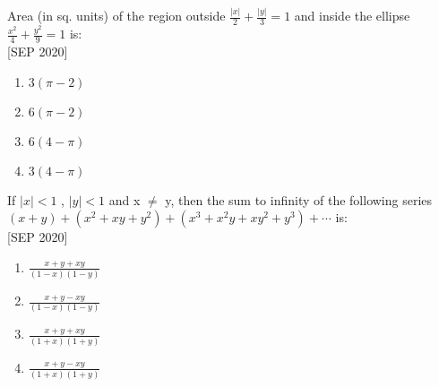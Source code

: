     \item Area (in sq. units) of the region outside $\frac{|x|}{2} + \frac{|y|}{3} = 1$ and inside the ellipse $\frac{x^2}{4} + \frac{y^2}{9} = 1$ is: \\\hfill{[SEP 2020]}
    \begin{multicols}{4}
    \begin{enumerate}
        \item $3(\pi - 2)$
        \item $6(\pi - 2)$
        \item $6(4 - \pi)$
        \item $3(4 - \pi)$
    \end{enumerate} 
    \end{multicols}
    \item If $|x|<1$ , $|y|<1$ and x $\neq$ y, then the sum to infinity of the following series $(x+y)+(x^2+xy+y^2)+(x^3+x^2y+xy^2+y^3)+\cdots$ is: \\\hfill{[SEP 2020]}
    \begin{multicols}{4}
    \begin{enumerate}
        \item $\frac{x + y + xy}{(1 - x)(1 - y)}$
        \item $\frac{x + y - xy}{(1 - x)(1 - y)}$
        \item $\frac{x + y + xy}{(1 + x)(1 + y)}$
        \item $\frac{x + y - xy}{(1 + x)(1 + y)}$
    \end{enumerate} 
    \end{multicols}


